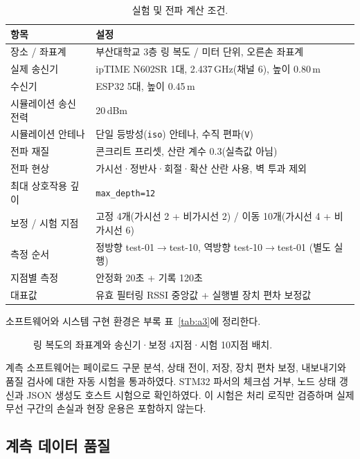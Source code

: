 \documentclass[11pt,a4paper]{article}
\newcommand{\figplaceholder}[2][0.86\textwidth]{%
  \fbox{\begin{minipage}[c][#2][c]{#1}\centering\small\color{gray}
  [그림 삽입 예정]\end{minipage}}}
\begin{document}
\begin{table}[htbp]
  \centering\small
  \caption{실험 및 전파 계산 조건.}
  \label{tab:cond}
  \begin{tabularx}{\textwidth}{@{}p{3.4cm} X@{}}
    \toprule
    \textbf{항목} & \textbf{설정} \\
    \midrule
    장소 / 좌표계 & 부산대학교 3층 링 복도 / 미터 단위, 오른손 좌표계 \\
    실제 송신기 & ipTIME N602SR 1대, 2.437\,GHz(채널 6), 높이 0.80\,m \\
    수신기 & ESP32 5대, 높이 0.45\,m \\
    시뮬레이션 송신 전력 & 20\,dBm \\
    시뮬레이션 안테나 & 단일 등방성(\texttt{iso}) 안테나, 수직 편파(\texttt{V}) \\
    전파 재질 & 콘크리트 프리셋, 산란 계수 0.3(실측값 아님) \\
    전파 현상 & 가시선·정반사·회절·확산 산란 사용, 벽 투과 제외 \\
    최대 상호작용 깊이 & \texttt{max\_depth=12} \\
    보정 / 시험 지점 & 고정 4개(가시선 2 + 비가시선 2) / 이동 10개(가시선 4 + 비가시선 6) \\
    측정 순서 & 정방향 test-01$\rightarrow$test-10, 역방향 test-10$\rightarrow$test-01 (별도 실행) \\
    지점별 측정 & 안정화 20초 + 기록 120초 \\
    대표값 & 유효 필터링 RSSI 중앙값 + 실행별 장치 편차 보정값 \\
    \bottomrule
  \end{tabularx}
\end{table}

소프트웨어와 시스템 구현 환경은 부록 표~\ref{tab:a3}에 정리한다.

\begin{figure}[htbp]
  \centering
  \figplaceholder{4.2cm}
  \caption{링 복도의 좌표계와 송신기·보정 4지점·시험 10지점 배치.}
  \label{fig:layout}
\end{figure}

계측 소프트웨어는 페이로드 구문 분석, 상태 전이, 저장, 장치 편차 보정, 내보내기와 품질 검사에 대한 자동
시험을 통과하였다. STM32 파서의 체크섬 거부, 노드 상태 갱신과 JSON 생성도 호스트 시험으로 확인하였다.
이 시험은 처리 로직만 검증하며 실제 무선 구간의 손실과 현장 운용은 포함하지 않는다.

\subsection{계측 데이터 품질}
\end{document}

